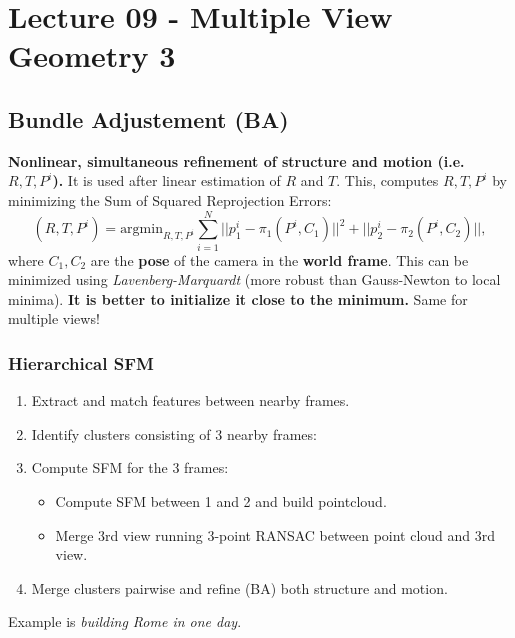 \documentclass[a4paper,12 pt]{article}
\theoremstyle{definition}
\theoremstyle{remark}
\theoremstyle{definition}
\theoremstyle{definition}
\theoremstyle{definition}
\theoremstyle{remark}
\theoremstyle{definition}
\begin{document}
\section*{Lecture 09 - Multiple View Geometry 3}
\subsection*{Bundle Adjustement (BA)}
\textbf{Nonlinear, simultaneous refinement of structure and motion (i.e. $R,T,P^i$).} It is used after linear estimation of $R$ and $T$. This, computes $R,T,P^i$ by minimizing the Sum of Squared Reprojection Errors:
\begin{equation}
(R,T,P^i)=\text{argmin}_{R,T,P^i} \sum_{i=1}^N ||p_1^i-\pi_1(P^i,C_1)||^2+||p_2^i-\pi_2(P^i,C_2)||,
\end{equation}
where $C_1,C_2$ are the \textbf{pose} of the camera in the \textbf{world frame}. This can be minimized using \textit{Lavenberg-Marquardt} (more robust than Gauss-Newton to local minima). \textbf{It is better to initialize it close to the minimum.} Same for multiple views!
\subsubsection*{Hierarchical SFM}
\begin{enumerate}
\item Extract and match features between nearby frames.
\item Identify clusters consisting of 3 nearby frames:
\item Compute SFM for the 3 frames:
\begin{itemize}
\item Compute SFM between 1 and 2 and build pointcloud.
\item Merge 3rd view running 3-point RANSAC between point cloud and 3rd view.
\end{itemize}
\item Merge clusters pairwise and refine (BA) both structure and motion. 
\end{enumerate}
Example is \textit{building Rome in one day}.
\end{document}
